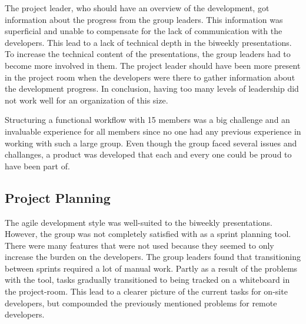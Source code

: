 The project leader, who should have an overview of the development, got information about the progress from the group leaders. This information was superficial and unable to compensate for the lack of communication with the developers. This lead to a lack of technical depth in the biweekly presentations. To increase the technical content of the presentations, the group leaders had to become more involved in them. The project leader should have been more present in the project room when the developers were there to gather information about the development progress. In conclusion, having too many levels of leadership did not work well for an organization of this size.

Structuring a functional workflow with 15 members was a big challenge and an invaluable experience for all members since no one had any previous experience in working with such a large group. Even though the group faced several issues and challanges, a product was developed that each and every one could be proud to have been part of.

\subsection{Project Planning}
The agile development style was well-suited to the biweekly presentations. However, the group was not completely satisfied with \taiga{} as a sprint planning tool. There were many features that were not used because they seemed to only increase the burden on the developers. The group leaders found that transitioning between sprints required a lot of manual work. Partly as a result of the problems with the tool, tasks gradually transitioned to being tracked on a whiteboard in the project-room. This lead to a clearer picture of the current tasks for on-site developers, but compounded the previously mentioned problems for remote developers.

